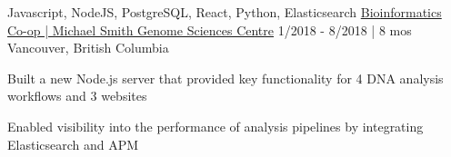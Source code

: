 \begin{cventries}
  \cventry
    {Javascript, NodeJS, PostgreSQL, React, Python, Elasticsearch} %
    {\href{https://bobheadxi.dev/experience/bcgsc}{Bioinformatics Co-op | Michael Smith Genome Sciences Centre}} %
    {1/2018 - 8/2018 | 8 mos} %
    {Vancouver, British Columbia} %
    {
      \begin{cvitems} %
        \item {Built a new Node.js server that provided key functionality for 4 DNA analysis workflows and 3 websites}
        \item {Enabled visibility into the performance of analysis pipelines by integrating Elasticsearch and APM}
      \end{cvitems}
    }

\end{cventries}
